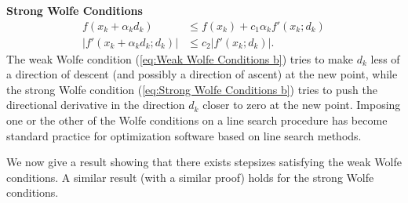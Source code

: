 \par
\noindent\textbf{Strong Wolfe Conditions}
\begin{subequations}
    \begin{align}
        f(x_k+\alpha_k d_k) &\leq f(x_k)+c_1\alpha_kf'(x_k;d_k)\label{eq:Strong Wolfe Conditions a}\\
        |f'(x_k+\alpha_kd_k;d_k)| &\leq c_2|f'(x_k;d_k)| .\label{eq:Strong Wolfe Conditions b}
    \end{align}
\end{subequations}
The weak Wolfe condition (\ref{eq:Weak Wolfe Conditions b}) tries to make $d_k$
less of a direction of descent (and possibly a direction of ascent) at the new point, 
while the strong Wolfe condition (\ref{eq:Strong Wolfe Conditions b}) tries to push the
directional derivative in the direction $d_k$
closer to zero at the new point. Imposing one or
the other of the Wolfe conditions on a line search procedure has become standard practice
for optimization software based on line search methods.
\par
We now give a result showing that there exists stepsizes satisfying the weak Wolfe conditions. 
A similar result (with a similar proof) holds for the strong Wolfe conditions.       

